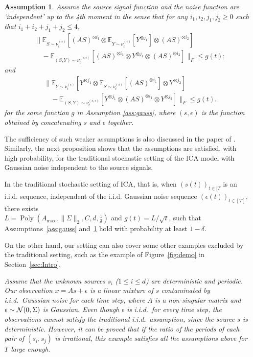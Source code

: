 \documentclass[twoside,11pt]{article}
\newcommand{\cN}{\cal{N}}
\newcommand{\E}{\mathbb{E}}
\newcommand{\iid}{i.i.d.\xspace}
\DeclareMathOperator{\pol}{Poly}
\newcommand{\poly}[1]{\pol\left(#1\right)}
\newtheorem{assumption}{Assumption}
\newcommand{\eps}{\epsilon}
\begin{document}
\begin{assumption}
\label{ass:independence}
Assume the source signal function and the noise function are `independent' up to the 4th moment in the sense that for any $i_1,i_2,j_1,j_2 \ge 0$ such that $i_1+i_2+j_1+j_2 \le 4$,  
\begin{align*}
& \| \E_{S\sim \nu_t^{(s)}} [(AS)^{\otimes i_1}\otimes \E_{Y\sim \nu_t^{(\epsilon)}} [Y^{\otimes j_1}] \otimes (AS)^{\otimes i_2}]\\
& \quad - \E_{(S, Y)\sim \nu_t^{(s, \epsilon)}} [(AS)^{\otimes i_1}\otimes Y^{\otimes j_1}\otimes (AS)^{\otimes i_2}]  \|_F 
 \le g(t); %
\end{align*}
and 
\begin{align*}
& \| \E_{Y\sim \nu_t^{(\epsilon)}} [Y^{\otimes j_1} \otimes \E_{S\sim \nu_t^{(s)}} [(AS)^{\otimes i_1}] \otimes Y^{\otimes j_2}] \\
& \quad - \E_{(S, Y)\sim \nu_t^{(s, \epsilon)}} [ Y^{\otimes j_1}\otimes (AS)^{\otimes i_1}\otimes Y^{\otimes j_2}] \|_F 
\le g(t). %
\end{align*}
for the same function $g$ in Assumption \ref{ass:gauss}, where $(s,\epsilon)$ is the function obtained by concatenating $s$ and $\epsilon$ together.  
\end{assumption}
The sufficiency of such weaker assumptions is also discussed in the paper of \citet{frieze1996learning}.
Similarly, the next proposition shows that the assumptions are satisfied, with high probability, for the traditional stochastic setting of the ICA model with Gaussian noise independent to the source signals.
\begin{proposition}
\label{prop:stochasticAss}
In the traditional stochastic setting of ICA, that is, when $(s(t))_{t\in[T}$ is an \iid sequence, independent of the \iid Gaussian noise sequence $(\epsilon(t))_{t\in[T]}$, there exists \\ $L = \poly{A_{\max}, \|\Sigma\|_2, C, d,\frac{1}{\delta}}$ and $g(t) = L/\sqrt{t}$, such that Assumptions~\ref{ass:gauss} and~\ref{ass:independence} hold with probability at least $1-\delta$.
\end{proposition}
On the other hand, our setting can also cover some other examples excluded by the traditional setting, such as the example of Figure~\ref{fig:demo} in Section~\ref{sec:Intro}.
\begin{example} \em
\label{ex:periodic}
Assume that the unknown sources $s_i$ ($1\le i\le d$) are deterministic and periodic. Our observation $x=As+\eps$ is a linear mixture of $s$ contaminated by i.i.d.\ Gaussian noise for each time step, where $A$ is a non-singular matrix and $\eps\sim {\cN}(0,\Sigma)$ is Gaussian.   
Even though $\eps$ is i.i.d.\ for every time step, the observations cannot satisfy the traditional i.i.d.\ assumption, since the source $s$ is deterministic. However, it can be proved that if the ratio of the periods of each pair of $(s_i, s_j)$ is irrational, this example satisfies all the assumptions above for $T$ large enough.   
\end{example}
\end{document}
